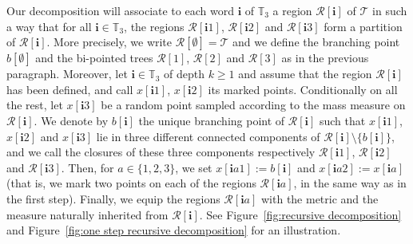 \documentclass[JEP,XML,SOM,Unicode,NoFloatCountersInSection,published]{cedram}
\let\backslash\setminus
\newcommand{\Tt}{\mathcal{T}}
\newcommand{\Rr}{\mathcal{R}}
\newcommand{\ii}{\mathbf{i}}
\theoremstyle{plain}
\theoremstyle{definition}
\begin{document}
Our decomposition will associate to each word $\ii $ of $\mathbb{T}_3$ a region $\Rr[\ii ]$ of $\Tt$ in such a way that for all $\ii \in \mathbb{T}_3$, the regions $\Rr[\ii 1]$, $\Rr[\ii 2]$ and $\Rr[\ii 3]$ form a partition of $\Rr[\ii ]$.
More precisely, we write $\Rr[\emptyset]=\Tt$ and we define the branching point $b[\emptyset]$ and the bi-pointed trees $\Rr[1]$, $\Rr[2]$ and $\Rr[3]$ as in the previous paragraph.
Moreover, let $\ii \in \mathbb{T}_3$ of depth $k \geq 1$ and assume that the region $\Rr[\ii ]$ has been defined, and call $x[\ii 1]$, $x[\ii 2]$ its marked points.
Conditionally on all the rest, let $x[\ii 3]$ be a random point sampled according to the mass measure on $\Rr[\ii ]$.
We denote by $b[\ii]$ the unique branching point of $\Rr[\ii ]$ such that $x[\ii 1]$, $x[\ii 2]$ and $x[\ii 3]$ lie in three different connected components of $\Rr[\ii ] \backslash \{b[\ii]\}$, and we call the closures of these three components respectively $\Rr[\ii 1]$, $\Rr[\ii 2]$ and $\Rr[\ii 3]$.
Then, for $a \in \{1,2,3\}$, we set $x[\ii a1]:=b[\ii]$ and $x[\ii a 2]:=x[\ii a]$ (that is, we mark two points on each of the regions $\Rr[\ii a]$, in the same way as in the first step).
Finally, we equip the regions $\Rr[\ii a]$ with the metric and the measure naturally inherited from $\Rr[\ii ]$.
See Figure~\ref{fig:recursive decomposition} and Figure~\ref{fig:one step recursive decomposition} for an illustration.
\end{document}
